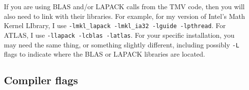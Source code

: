 \documentclass[twoside,letterpaper,11pt]{article}
\begin{document}
\begin{enumerate}
If you are using BLAS and/or LAPACK calls from the TMV code,
then you will also need to 
link with their libraries.  
For example, for my version of Intel's Math Kernel LIbrary, I use 
\texttt{-lmkl\_lapack -lmkl\_ia32 -lguide -lpthread}.  
For ATLAS,
I use \texttt{-llapack -lcblas -latlas}.  For your specific installation, you may need 
the same thing, or something slightly different, including possibly
\texttt{-L} flags to indicate where the BLAS or LAPACK libraries are located.

\end{enumerate}

\subsection{Compiler flags}
\label{Install_Flags}
\end{document}
